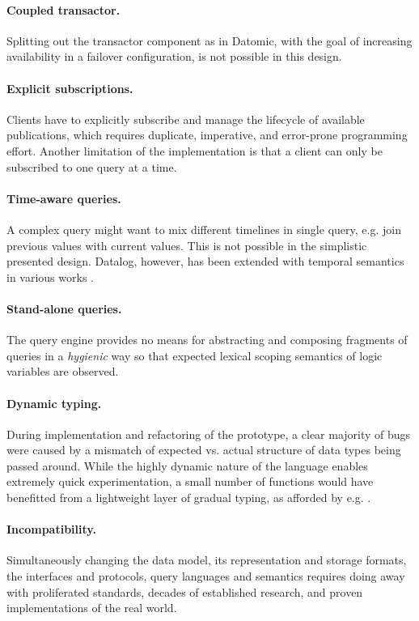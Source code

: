 \paragraph{Coupled transactor.} Splitting out the transactor component as in Datomic, with the goal of increasing availability in a failover configuration, is not possible in this design.

\paragraph{Explicit subscriptions.} Clients have to explicitly subscribe and manage the lifecycle of available publications, which requires duplicate, imperative, and error-prone programming effort. Another limitation of the implementation is that a client can only be subscribed to one query at a time.

\paragraph{Time-aware queries.} A complex query might want to mix different timelines in single query, e.g. join previous values with current values. This is not possible in the simplistic presented design. Datalog, however, has been extended with temporal semantics in various works \cite{alvaro2010dedalus, aref2015design}.

\paragraph{Stand-alone queries.} The query engine provides no means for abstracting and composing fragments of queries in a \emph{hygienic} way so that expected lexical scoping semantics of logic variables are observed.

\paragraph{Dynamic typing.} During implementation and refactoring of the prototype, a clear majority of bugs were caused by a mismatch of expected vs. actual structure of data types being passed around. While the highly dynamic nature of the language enables extremely quick experimentation, a small number of functions would have benefitted from a lightweight layer of gradual typing, as afforded by e.g.  \cite{pinzaru2019towards}.

\paragraph{Incompatibility.} Simultaneously changing the data model, its representation and storage formats, the interfaces and protocols, query languages and semantics requires doing away with proliferated standards, decades of established research, and proven implementations of the real world.


